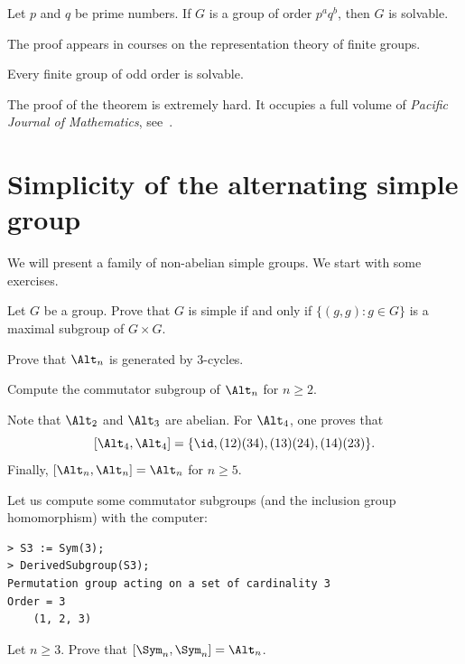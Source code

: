 \begin{theorem}[Burnside]
    Let $p$ and $q$ be prime numbers. If $G$ is a group
    of order $p^aq^b$, then $G$ is solvable. 
\end{theorem}

The proof appears in courses on the 
representation theory of finite groups. 

\begin{theorem}
    Every finite group of odd order is solvable.
\end{theorem}

The proof of the theorem is extremely hard. It occupies a full volume of
\emph{Pacific Journal of Mathematics}, see~\cite{MR166261}.



\section{Simplicity of the alternating simple group}

We will present a family of non-abelian simple groups. 
We start with some exercises. 

\begin{exercise}
\label{xca:diagonal}
    Let $G$ be a group. 
    Prove that $G$ is simple if and only if 
    $\{(g,g):g\in G\}$ 
    is a maximal subgroup of $G\times G$. 
\end{exercise}

\begin{exercise}
    Prove that $\Alt_n$ is generated by 3-cycles. 
\end{exercise}

\begin{exercise}
    Compute the commutator subgroup of $\Alt_n$ for
    $n\geq2$. 
\end{exercise}

Note that $\Alt_2$ and $\Alt_3$ are abelian. 
For $\Alt_4$, one proves that 
\[
[\Alt_4,\Alt_4]=\{\id,(12)(34),(13)(24),(14)(23)\}.
\]
Finally, $[\Alt_n,\Alt_n]=\Alt_n$ for $n\geq5$. 

Let us compute some commutator subgroups (and the inclusion group homomorphism)  
with the computer:
\begin{lstlisting}
> S3 := Sym(3);
> DerivedSubgroup(S3);
Permutation group acting on a set of cardinality 3
Order = 3
    (1, 2, 3)   
\end{lstlisting}

\begin{exercise}
    Let $n\geq3$. 
    Prove that $[\Sym_n,\Sym_n]=\Alt_n$. 
\end{exercise}

